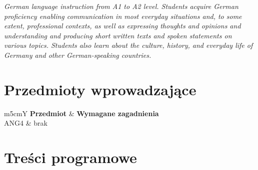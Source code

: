 \documentclass[12pt, a4paper]{article}
\newcommand{\thdrule}{\noalign{\global\setlength{\extrarowheight}{0pt}}}
\newcommand{\thdend}{\noalign{\global\setlength{\extrarowheight}{3pt}}}
\begin{document}
\textit{German language instruction from A1 to A2 level. Students acquire German proficiency enabling communication in most everyday situations and, to some extent, professional contexts, as well as expressing thoughts and opinions and understanding and producing short written texts and spoken statements on various topics. Students also learn about the culture, history, and everyday life of Germany and other German-speaking countries.}


\section{Przedmioty wprowadzające}

{\scriptsize
\begin{tabularx}{\textwidth}{m{5cm}Y}
\thdrule\toprule
{} {\color{white}\textbf{Przedmiot}} & {\color{white}\textbf{Wymagane zagadnienia}} \\
\midrule\thdend
   ANG4 & brak \\
\bottomrule
\end{tabularx}}

\section{Treści programowe}
\end{document}
